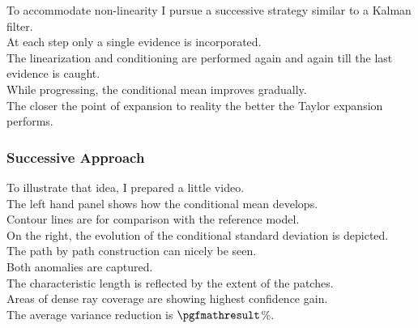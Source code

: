 \documentclass[aspectratio=169, t, 10pt,
    ]{beamer}
\begin{document}
To accommodate non-linearity I pursue a successive strategy similar to a Kalman filter.
\\
At each step only a single evidence is incorporated.
\\
The linearization and conditioning are performed again and again till the last evidence is caught.
\\
While progressing, the conditional mean improves gradually.
\\
The closer the point of expansion to reality the better the Taylor expansion performs.


\begin{frame}
    \frametitle{Successive Approach}
    \begin{center}
    \end{center}
\end{frame}

To illustrate that idea, I prepared a little video.
\\
The left hand panel shows how the conditional mean develops.
\\
Contour lines are for comparison with the reference model.
\\
On the right, the evolution of the conditional standard deviation is depicted.
\\[2mm]

The path by path construction can nicely be seen.
\\
Both anomalies are captured.
\\
The characteristic length is reflected by the extent of the patches.
\\
Areas of dense ray coverage are showing highest confidence gain.
\\
The average variance reduction is $\pgfmathresult$\%.
\end{document}
